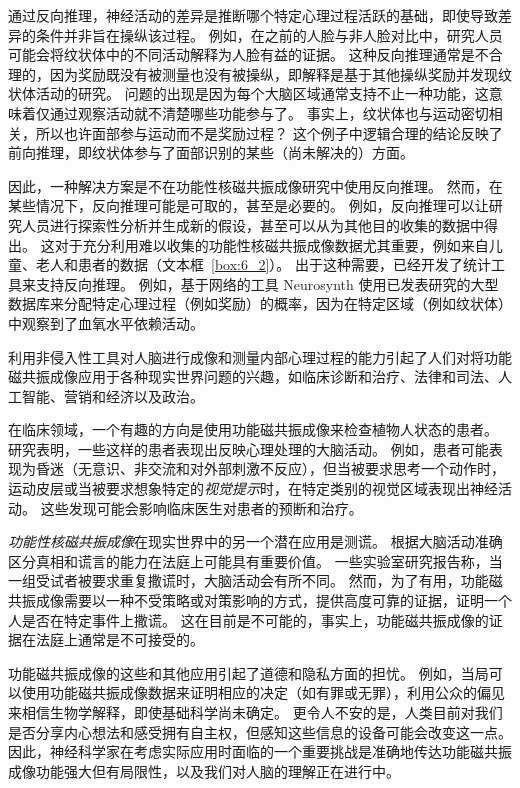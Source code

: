 通过反向推理，神经活动的差异是推断哪个特定心理过程活跃的基础，即使导致差异的条件并非旨在操纵该过程。 
例如，在之前的人脸与非人脸对比中，研究人员可能会将纹状体中的不同活动解释为人脸有益的证据。
这种反向推理通常是不合理的，因为奖励既没有被测量也没有被操纵，即解释是基于其他操纵奖励并发现纹状体活动的研究。
问题的出现是因为每个大脑区域通常支持不止一种功能，这意味着仅通过观察活动就不清楚哪些功能参与了。
事实上，纹状体也与运动密切相关，所以也许面部参与运动而不是奖励过程？
这个例子中逻辑合理的结论反映了前向推理，即纹状体参与了面部识别的某些（尚未解决的）方面。


因此，一种解决方案是不在功能性核磁共振成像研究中使用反向推理。
然而，在某些情况下，反向推理可能是可取的，甚至是必要的。
例如，反向推理可以让研究人员进行探索性分析并生成新的假设，甚至可以从为其他目的收集的数据中得出。
这对于充分利用难以收集的功能性核磁共振成像数据尤其重要，例如来自儿童、老人和患者的数据（文本框~\ref{box:6_2}）。
出于这种需要，已经开发了统计工具来支持反向推理。
例如，基于网络的工具 Neurosynth 使用已发表研究的大型数据库来分配特定心理过程（例如奖励）的概率，因为在特定区域（例如纹状体）中观察到了血氧水平依赖活动。


\begin{proposition}[现实世界中的大脑成像] \label{box:6_2}
	
	\quad \quad 利用非侵入性工具对人脑进行成像和测量内部心理过程的能力引起了人们对将功能磁共振成像应用于各种现实世界问题的兴趣，如临床诊断和治疗、法律和司法、人工智能、营销和经济以及政治。
	
	\quad \quad 在临床领域，一个有趣的方向是使用功能磁共振成像来检查植物人状态的患者。
	研究表明，一些这样的患者表现出反映心理处理的大脑活动。
	例如，患者可能表现为昏迷（无意识、非交流和对外部刺激不反应），但当被要求思考一个动作时，运动皮层或当被要求想象特定的\textit{视觉提示}时，在特定类别的视觉区域表现出神经活动。
	这些发现可能会影响临床医生对患者的预断和治疗。
	
	\quad \quad \textit{功能性核磁共振成像}在现实世界中的另一个潜在应用是测谎。
	根据大脑活动准确区分真相和谎言的能力在法庭上可能具有重要价值。
	一些实验室研究报告称，当一组受试者被要求重复撒谎时，大脑活动会有所不同。
	然而，为了有用，功能磁共振成像需要以一种不受策略或对策影响的方式，提供高度可靠的证据，证明一个人是否在特定事件上撒谎。
	这在目前是不可能的，事实上，功能磁共振成像的证据在法庭上通常是不可接受的。
	
	\quad \quad 功能磁共振成像的这些和其他应用引起了道德和隐私方面的担忧。
	例如，当局可以使用功能磁共振成像数据来证明相应的决定（如有罪或无罪），利用公众的偏见来相信生物学解释，即使基础科学尚未确定。
	更令人不安的是，人类目前对我们是否分享内心想法和感受拥有自主权，但感知这些信息的设备可能会改变这一点。
	因此，神经科学家在考虑实际应用时面临的一个重要挑战是准确地传达功能磁共振成像功能强大但有局限性，以及我们对人脑的理解正在进行中。
	
\end{proposition}


